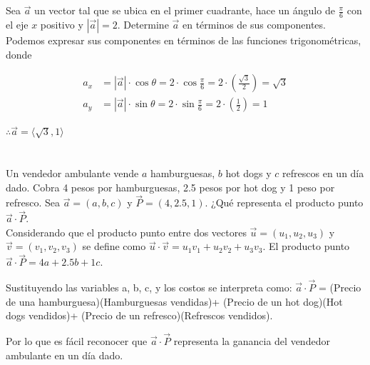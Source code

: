 \documentclass[12pt]{article}
\begin{document}
\section{}

Sea $\vec{a}$ un vector tal que se ubica en el primer cuadrante, hace un ángulo de $\frac{\pi}{6}$ con el eje $x$ positivo  y $|\vec{a}|=2$. Determine $\vec{a}$ en términos de sus componentes. \\

Podemos expresar sus componentes en términos de las funciones trigonométricas, donde

\begin{align*}
  a_x​
  &= |\vec{a}| \cdot \cos{\theta} 
  = 2 \cdot \cos{\frac{\pi}{6}} 
  = 2 \cdot \left( \frac{\sqrt{3}}{2} \right) 
  = \sqrt{3} \\
  a_y
  &= |\vec{a}| \cdot \sin{\theta} 
  = 2 \cdot \sin{\frac{\pi}{6}} 
  = 2 \cdot \left( \frac{1}{2} \right) 
  = 1 
\end{align*}

$\therefore \vec{a} = \langle \sqrt{3}, 1 \rangle$

\section{}

Un vendedor ambulante vende $a$ hamburguesas, $b$ hot dogs y $c$ refrescos en un día dado. Cobra 4 pesos por hamburguesas, 2.5 pesos por hot dog y 1 peso por refresco. Sea $\vec{a}=(a,b,c)$ y $\vec{P}=(4,2.5,1)$. ¿Qué representa el producto punto $\vec{a} \cdot \vec{P}$. \\

Considerando que el producto punto entre dos vectores $\vec{u} = (u_1, u_2, u_3)$ y  $\vec{v} = (v_1, v_2, v_3)$ se define como $\vec{u} \cdot \vec{v} = u_1v_1 + u_2v_2+u_3v_3$. El producto punto  $\vec{a} \cdot \vec{P} = 4a+ 2.5b+1c$.

Sustituyendo las variables a, b, c, y los costos se interpreta como:
$\vec{a} \cdot \vec{P}$ = (Precio de una hamburguesa)(Hamburguesas vendidas)+ (Precio de un hot dog)(Hot dogs vendidos)+ (Precio de un refresco)(Refrescos vendidos).

Por lo que es fácil reconocer que $\vec{a} \cdot \vec{P}$ representa la ganancia del vendedor ambulante en un día dado.
\end{document}
